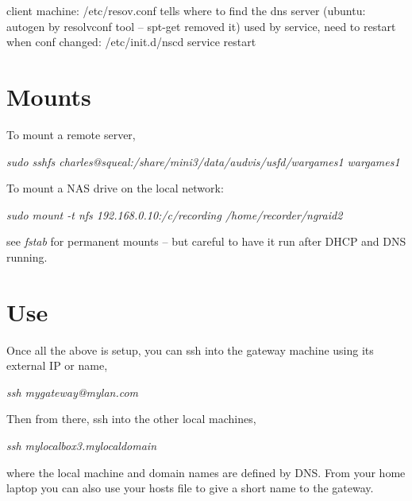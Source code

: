 \documentclass[oneside,english]{scrbook}
\begin{document}
    client machine: /etc/resov.conf tells where to find the dns server  (ubuntu: autogen by resolvconf tool -- spt-get removed it)
        used by service, need to restart when conf changed:
            /etc/init.d/nscd service restart

\section{Mounts}

To mount a remote server,

\emph{sudo sshfs charles@squeal:/share/mini3/data/audvis/usfd/wargames1
wargames1 }

To mount a NAS drive on the local network:

\emph{sudo mount -t nfs 192.168.0.10:/c/recording /home/recorder/ngraid2 }

see \emph{fstab} for permanent mounts -- but careful to have it run
after DHCP and DNS running.

\section{Use}

Once all the above is setup, you can ssh into the gateway machine
using its external IP or name,

\emph{ssh mygateway@mylan.com}

Then from there, ssh into the other local machines,

\emph{ssh mylocalbox3.mylocaldomain}

where the local machine and domain names are defined by DNS. From
your home laptop you can also use your hosts file to give a short
name to the gateway.
\end{document}
